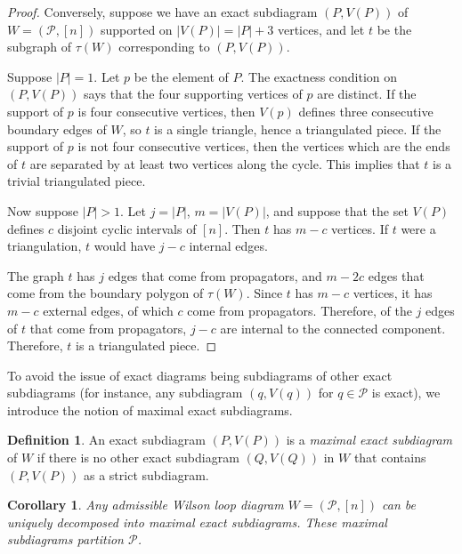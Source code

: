 \documentclass[11pt]{article}
\newcommand{\cP}{\mathcal{P}}
\newtheorem{cor}[thm]{Corollary}
\theoremstyle{remark}
\theoremstyle{definition}
\newtheorem{dfn}[thm]{Definition}
\begin{document}
\begin{proof}
Conversely, suppose we have an exact subdiagram $(P, V(P))$ of $W = (\cP, [n])$ supported on $|V(P)| = |P|+3$ vertices, and let $t$ be the subgraph of $\tau(W)$ corresponding to $(P,V(P))$.

Suppose $|P|=1$. Let $p$ be the element of $P$. The exactness condition on $(P, V(P))$ says that the four supporting vertices of $p$ are distinct.  If the support of $p$ is four consecutive vertices, then $V(p)$ defines three consecutive boundary edges of $W$, so $t$ is a single triangle, hence a triangulated piece.  If the support of $p$ is not four consecutive vertices, then the vertices which are the ends of $t$ are separated by at least two vertices along the cycle.  This implies that $t$ is a trivial triangulated piece.

Now suppose $|P|>1$.  Let $j=|P|$, $m=|V(P)|$, and 
suppose that the set $V(P)$ defines $c$ disjoint cyclic intervals of $[n]$. Then $t$ has $m-c$ vertices.  If $t$ were a triangulation, $t$ would have $j -c$ internal edges.

The graph $t$ has $j$ edges that come from propagators, and $m - 2c$ edges that come from the boundary polygon of $\tau(W)$. Since $t$ has $m-c$ vertices, it has $m-c$ external edges, of which $c$ come from propagators. Therefore, of the $j$ edges of $t$ that come from propagators, $j-c$ are internal to the connected component. Therefore, $t$ is a triangulated piece.


\end{proof}





To avoid the issue of exact diagrams being subdiagrams of other exact subdiagrams (for instance, any subdiagram $(q, V(q))$ for $q \in \cP$ is exact), we introduce the notion of maximal exact subdiagrams.

\begin{dfn}
An exact subdiagram $(P, V(P))$ is a {\em maximal exact subdiagram} of $W$ if there is no other exact subdiagram $(Q, V(Q))$ in $W$ that contains $(P,V(P))$ as a strict subdiagram.
\end{dfn}

\begin{cor} \label{uniqueproppartitioncor}
Any admissible Wilson loop diagram $W = (\cP, [n])$ can be uniquely decomposed into maximal exact subdiagrams. These maximal subdiagrams partition $\cP$.
\end{cor}
\end{document}
